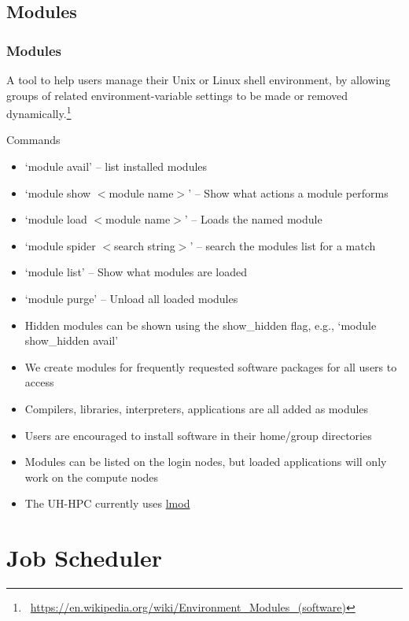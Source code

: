 \subsection{Modules}
\begin{frame}
	\frametitle{Modules}\footnotesize

	  A tool to help users manage their Unix or Linux shell environment, by allowing groups of related environment-variable settings to be made or removed dynamically.\footnote{\label{wiki_module}\tiny\
             \url{https://en.wikipedia.org/wiki/Environment_Modules_(software)}}
	\begin{block}{Commands}
	  \begin{itemize}\footnotesize
			\item `module avail' -- list installed modules
			\item `module show $<$module name$>$' -- Show what actions a module performs
			\item `module load $<$module name$>$' -- Loads the named module
                        \item `module spider $<$search string$>$' -- search the modules list for a match
                        \item `module list' -- Show what modules are loaded
			\item `module purge' -- Unload all loaded modules
		\end{itemize}
        \end{block}
	\begin{itemize}\footnotesize
                \item Hidden modules can be shown using the \ddash{}show\_hidden flag, e.g., `module \ddash{}show\_hidden avail'
	        \item We create modules for frequently requested software packages for all users to access
		\item Compilers, libraries, interpreters, applications are all added as modules
		\item Users are encouraged to install software in their home/group directories
		\item Modules can be listed on the login nodes, but loaded applications will only work on the compute nodes
                \item The UH-HPC currently uses \href{https://lmod.readthedocs.io/en/latest/010\_user.html}{lmod}
	\end{itemize}
\end{frame}

\section[Job Scheduler]{Job Scheduler}

